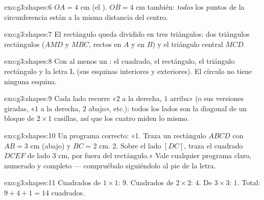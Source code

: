 \begin{solution}{exo:g3:shapes:6}
$OA = 4$ cm (el ). $OB = 4$ cm también: \emph{todos} los puntos de
la circunferencia están a la misma distancia del centro.
\end{solution}

\begin{solution}{exo:g3:shapes:7}
El rectángulo queda dividido en tres triángulos: dos triángulos rectángulos
($AMD$ y $MBC$, rectos en $A$ y en $B$) y el triángulo
central $MCD$.
\end{solution}

\begin{solution}{exo:g3:shapes:8}
Con al menos un : el cuadrado, el rectángulo, el triángulo
rectángulo y la letra L (sus esquinas interiores y exteriores). El círculo
no tiene ninguna esquina.
\end{solution}

\begin{solution}{exo:g3:shapes:9}
Cada lado recorre «$2$ a la derecha, $1$ arriba» (o sus versiones giradas,
«$1$ a la derecha, $2$ abajo», etc.): todos los lados son la diagonal de un
bloque de $2 \times 1$ casillas, así que los cuatro miden lo mismo.
\end{solution}

\begin{solution}{exo:g3:shapes:10}
Un programa correcto: «1. Traza un rectángulo $ABCD$ con $AB = 3$ cm
(abajo) y $BC = 2$ cm. 2. Sobre el lado $[DC]$, traza el
cuadrado $DCEF$ de lado $3$ cm, por fuera del rectángulo.» Vale cualquier programa
claro, numerado y completo --- compruébalo siguiéndolo
al pie de la letra.
\end{solution}

\begin{solution}{exo:g3:shapes:11}
Cuadrados de $1 \times 1$: $9$. Cuadrados de $2 \times 2$: $4$.
De $3 \times 3$: $1$. Total: $9 + 4 + 1 = 14$ cuadrados.
\end{solution}
